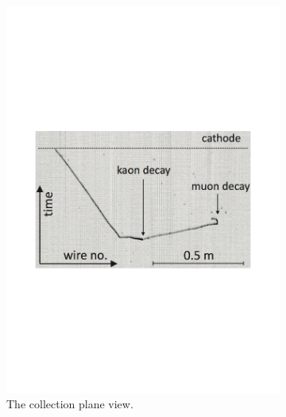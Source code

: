 \begin{figure}
    \centering
  \begin{subfigure}{0.48\textwidth}
    \centering
    \includegraphics[width=\textwidth]{ICARUSKaon_Col}
    \caption{The collection plane view.}
  \end{subfigure}%
  \hspace{0.05\textwidth}
  \begin{subfigure}{0.42\textwidth}
    \centering

\end{subfigure}
\end{figure}
